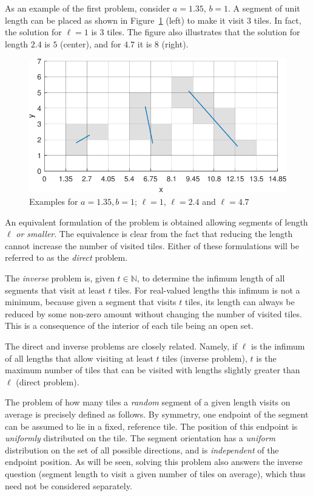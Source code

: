 \documentclass[12pt, a4paper]{article}
\newcommand{\len}{\ell} %
\newcommand{\tiles}{t} %
\newcommand{\touch}{visit}
\newcommand{\touches}{visits}
\newcommand{\touched}{visited}
\newcommand{\touching}{visiting}
\begin{document}
As an example of the first problem, consider $a=1.35$, $b=1$. A segment of unit length can be placed as shown in Figure~\ref{fig: examples} (left) to make it \touch{} $3$ tiles. In fact, the solution for $\len=1$ is $3$ tiles. The figure also illustrates that the solution for length $2.4$ is $5$ (center), and for $4.7$ it is $8$ (right).

\begin{figure}
\centering%
\includegraphics[width=.85\textwidth]{examples_1p35}%
\caption{Examples for $a=1.35, b=1$; $\len=1$, $\len=2.4$ and $\len=4.7$
}%
\label{fig: examples}%
\end{figure}%

An equivalent formulation of the problem is obtained allowing segments of length $\len$ \emph{or smaller}. The equivalence is clear from the fact that reducing the length cannot increase the number of \touched{} tiles. Either of these formulations will be referred to as the \emph{direct} problem.

The \emph{inverse} problem is, given $\tiles \in \mathbb N$, to determine the infimum length of all segments that \touch{} at least $\tiles$ tiles. For real-valued lengths this infimum is not a minimum, because given a segment that \touches{} $\tiles$ tiles, its length can always be reduced by some non-zero amount without changing the number of \touched{} tiles. This is a consequence of the interior of each tile being an open set.

The direct and inverse problems are closely related. Namely, if $\len$ is the infimum of all lengths that allow \touching{} at least $\tiles$ tiles (inverse problem), $\tiles$ is the maximum number of tiles that can be \touched{} with lengths slightly greater than $\len$ (direct problem).

The problem of how many tiles a \emph{random} segment of a given length \touches{} on average is precisely defined as follows. By symmetry, one endpoint of the segment can be assumed to lie in a fixed, reference tile. The position of this endpoint is \emph{uniformly} distributed on the tile. The segment orientation has a \emph{uniform} distribution on the set of all possible directions, and is \emph{independent} of the endpoint position. As will be seen, solving this problem also answers the inverse question (segment length to \touch{} a given number of tiles on average), which thus need not be considered separately. 
\end{document}
